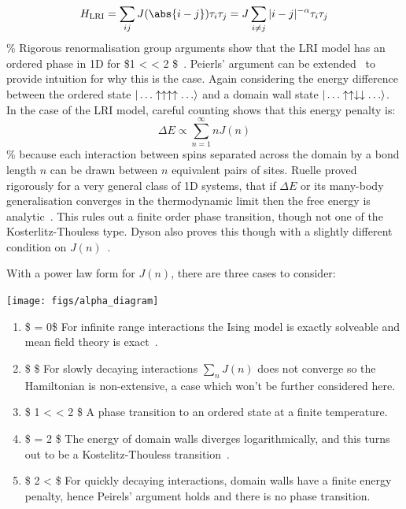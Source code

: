 \[H_{\mathrm{LRI}} = \sum_{ij} J(\abs{i-j}) \tau_i \tau_j = J \sum_{i\neq j} |i - j|^{-\alpha} \tau_i \tau_j\] \% Rigorous renormalisation group arguments show that the LRI model has an ordered phase in 1D for \$1 \textless{} \alpha \textless{} 2 \$~\autocite{dysonExistencePhasetransitionOnedimensional1969}. Peierls' argument can be extended~\autocite{thoulessLongRangeOrderOneDimensional1969} to provide intuition for why this is the case. Again considering the energy difference between the ordered state \(|\ldots\uparrow\uparrow\uparrow\uparrow\ldots\rangle\) and a domain wall state \(|\ldots\uparrow\uparrow\downarrow\downarrow\ldots\rangle\). In the case of the LRI model, careful counting shows that this energy penalty is: \[\Delta E \propto \sum_{n=1}^{\infty} n J(n)\] \% because each interaction between spins separated across the domain by a bond length \(n\) can be drawn between \(n\) equivalent pairs of sites. Ruelle proved rigorously for a very general class of 1D systems, that if \(\Delta E\) or its many-body generalisation converges in the thermodynamic limit then the free energy is analytic~\autocite{ruelleStatisticalMechanicsOnedimensional1968}. This rules out a finite order phase transition, though not one of the Kosterlitz-Thouless type. Dyson also proves this though with a slightly different condition on \(J(n)\)~\autocite{dysonExistencePhasetransitionOnedimensional1969}.

With a power law form for \(J(n)\), there are three cases to consider:

\begin{center}
    \texttt{[image: figs/alpha\_diagram]}
\end{center}

\begin{enumerate}
\def\labelenumi{\arabic{enumi}.}
\tightlist
\item
  \$ \alpha = 0\$ For infinite range interactions the Ising model is exactly solveable and mean field theory is exact~\autocite{lipkinValidityManybodyApproximation1965}.
\item
  \$ \alpha {}\$ For slowly decaying interactions \(\sum_n J(n)\) does not converge so the Hamiltonian is non-extensive, a case which won't be further considered here.
\item
  \$ 1 \textless{} \alpha \textless{} 2 \$ A phase transition to an ordered state at a finite temperature.
\item
  \$ \alpha = 2 \$ The energy of domain walls diverges logarithmically, and this turns out to be a Kostelitz-Thouless transition~\autocite{thoulessLongRangeOrderOneDimensional1969}.
\item
  \$ 2 \textless{} \alpha \$ For quickly decaying interactions, domain walls have a finite energy penalty, hence Peirels' argument holds and there is no phase transition.
\end{enumerate}


